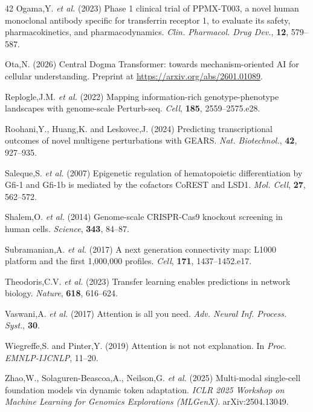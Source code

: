 \documentclass[12pt,a4paper]{article}
\begin{document}
\begin{thebibliography}{42}
Ogama,Y. \textit{et al.} (2023) Phase 1 clinical trial of PPMX-T003, a novel human monoclonal antibody specific for transferrin receptor 1, to evaluate its safety, pharmacokinetics, and pharmacodynamics. \textit{Clin. Pharmacol. Drug Dev.}, \textbf{12}, 579--587.

Ota,N. (2026) Central Dogma Transformer: towards mechanism-oriented AI for cellular understanding. Preprint at \url{https://arxiv.org/abs/2601.01089}.

Replogle,J.M. \textit{et al.} (2022) Mapping information-rich genotype-phenotype landscapes with genome-scale Perturb-seq. \textit{Cell}, \textbf{185}, 2559--2575.e28.

Roohani,Y., Huang,K. and Leskovec,J. (2024) Predicting transcriptional outcomes of novel multigene perturbations with GEARS. \textit{Nat. Biotechnol.}, \textbf{42}, 927--935.

Saleque,S. \textit{et al.} (2007) Epigenetic regulation of hematopoietic differentiation by Gfi-1 and Gfi-1b is mediated by the cofactors CoREST and LSD1. \textit{Mol. Cell}, \textbf{27}, 562--572.

Shalem,O. \textit{et al.} (2014) Genome-scale CRISPR-Cas9 knockout screening in human cells. \textit{Science}, \textbf{343}, 84--87.

Subramanian,A. \textit{et al.} (2017) A next generation connectivity map: L1000 platform and the first 1,000,000 profiles. \textit{Cell}, \textbf{171}, 1437--1452.e17.

Theodoris,C.V. \textit{et al.} (2023) Transfer learning enables predictions in network biology. \textit{Nature}, \textbf{618}, 616--624.

Vaswani,A. \textit{et al.} (2017) Attention is all you need. \textit{Adv. Neural Inf. Process. Syst.}, \textbf{30}.

Wiegreffe,S. and Pinter,Y. (2019) Attention is not not explanation. In \textit{Proc. EMNLP-IJCNLP}, 11--20.

Zhao,W., Solaguren-Beascoa,A., Neilson,G. \textit{et al.} (2025) Multi-modal single-cell foundation models via dynamic token adaptation. \textit{ICLR 2025 Workshop on Machine Learning for Genomics Explorations (MLGenX)}. arXiv:2504.13049.

\end{thebibliography}
\end{document}
